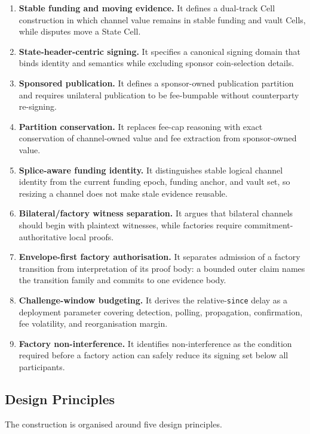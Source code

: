 \documentclass[a4paper,11pt]{article}
\begin{document}
\begin{enumerate}[label=C\arabic*.]
  \item \textbf{Stable funding and moving evidence.} It defines a dual-track Cell construction in which channel value remains in stable funding and vault Cells, while disputes move a State Cell.
  \item \textbf{State-header-centric signing.} It specifies a canonical signing domain that binds identity and semantics while excluding sponsor coin-selection details.
  \item \textbf{Sponsored publication.} It defines a sponsor-owned publication partition and requires unilateral publication to be fee-bumpable without counterparty re-signing.
  \item \textbf{Partition conservation.} It replaces fee-cap reasoning with exact conservation of channel-owned value and fee extraction from sponsor-owned value.
  \item \textbf{Splice-aware funding identity.} It distinguishes stable logical channel identity from the current funding epoch, funding anchor, and vault set, so resizing a channel does not make stale evidence reusable.
  \item \textbf{Bilateral/factory witness separation.} It argues that bilateral channels should begin with plaintext witnesses, while factories require commitment-authoritative local proofs.
  \item \textbf{Envelope-first factory authorisation.} It separates admission of a factory transition from interpretation of its proof body: a bounded outer claim names the transition family and commits to one evidence body.
  \item \textbf{Challenge-window budgeting.} It derives the relative-\texttt{since} delay as a deployment parameter covering detection, polling, propagation, confirmation, fee volatility, and reorganisation margin.
  \item \textbf{Factory non-interference.} It identifies non-interference as the condition required before a factory action can safely reduce its signing set below all participants.
\end{enumerate}

\subsection{Design Principles}

The construction is organised around five design principles.
\end{document}
